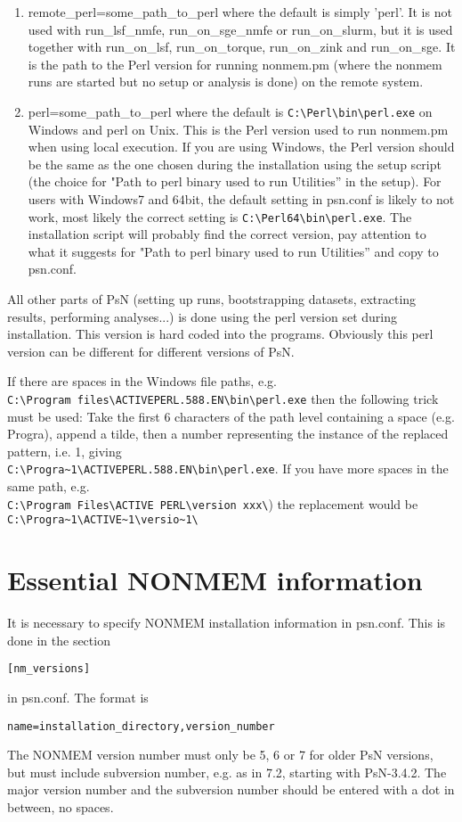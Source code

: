 \begin{enumerate}
\item remote\_perl=some\_path\_to\_perl
where the default is simply 'perl'. It is not used with run\_lsf\_nmfe, run\_on\_sge\_nmfe or run\_on\_slurm, but it is used together with run\_on\_lsf, run\_on\_torque, run\_on\_zink and run\_on\_sge. It is the path to the Perl version for running nonmem.pm (where the nonmem runs are started but no setup or analysis is done) on the remote system.

\item perl=some\_path\_to\_perl
where the default is \verb|C:\Perl\bin\perl.exe| on Windows and perl on Unix. This is the Perl version used to run nonmem.pm when using local execution. If you are using Windows, the Perl version should be the same as the one chosen during the installation using the setup script (the choice for "Path to perl binary used to run Utilities” in the setup).
For users with Windows7 and 64bit, the default setting in psn.conf is likely to not work, most likely the correct setting is 
\verb|C:\Perl64\bin\perl.exe|. 
The installation script will probably find the correct version, pay attention to what it suggests for "Path to perl binary used to run Utilities” and copy to psn.conf. 
\end{enumerate}

All other parts of PsN (setting up runs, bootstrapping datasets, extracting results, performing analyses...) is done using the perl version set during installation. This version is hard 
coded into the programs. Obviously this perl version can be different for different versions of PsN.

If there are spaces in the Windows file paths, e.g. \\
\verb|C:\Program files\ACTIVEPERL.588.EN\bin\perl.exe| 
then the following trick must be used: Take the first 6 characters of the path level containing a space (e.g. Progra), append a tilde, then a number representing the instance of the replaced pattern, i.e. 1, 
giving\\
\verb|C:\Progra~1\ACTIVEPERL.588.EN\bin\perl.exe|. 
If you have more spaces in the same path, e.g.\\ 
\verb|C:\Program Files\ACTIVE PERL\version xxx\|) 
the replacement would be \\
\verb|C:\Progra~1\ACTIVE~1\versio~1\|

\section{Essential NONMEM information}
It is necessary to specify NONMEM installation information in psn.conf. This is done in the section
\begin{verbatim}
[nm_versions]
\end{verbatim}
in psn.conf. The format is 
\begin{verbatim}
name=installation_directory,version_number
\end{verbatim}
The NONMEM version number must only be 5, 6 or 7 for older PsN versions, but must include subversion number, e.g. as in 7.2, starting with PsN-3.4.2. The major version number and the subversion number should be entered with a dot in between, no spaces.  

